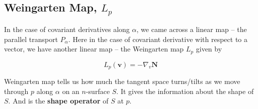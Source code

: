 \subsection{Weingarten Map, $L_p$}
	In the case of covariant derivatives along $\alpha$, we came across a linear map -- the parallel transport $P_\alpha$.
	Here in the case of covariant derivative with respect to a vector, we have another linear map -- the  Weingarten map $L_p$ given by

\begin{equation}
	L_p(\mathbf{v}) = -\nabla_v \mathbf{N}
\end{equation}
	
	Weingarten map tells us how much the tangent space turns/tilts as we move through $p$ along $\alpha$ on an $n$-surface $S$.
	It gives the information about the shape of $S$.
	And is the \textbf{shape operator} of $S$ at $p$.

